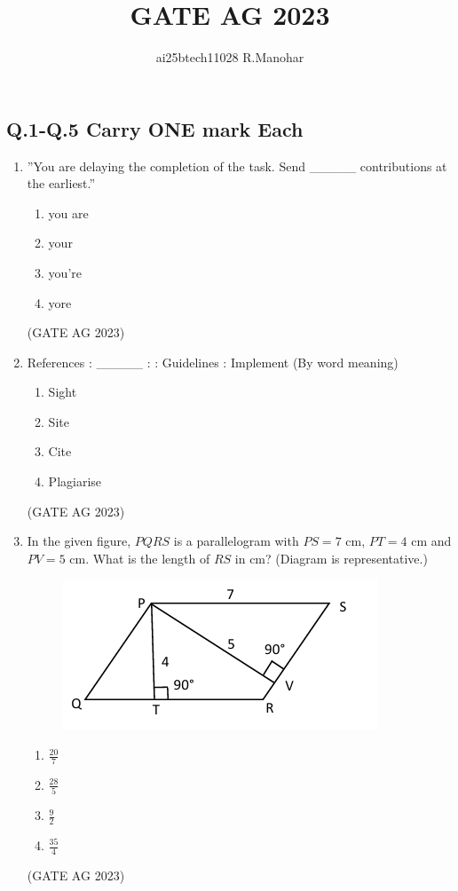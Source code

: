 \documentclass[journal,12pt,onecolumn]{IEEEtran}
\title{GATE AG 2023}
\author{ai25btech11028 R.Manohar}
\theoremstyle{remark}
\begin{document}
\maketitle

\subsection{Q.1-Q.5 Carry ONE mark Each}
\begin{enumerate}

\item ''You are delaying the completion of the task. Send \_\_\_\_\_ contributions at the earliest.''
\begin{multicols}{4}
\begin{enumerate}
    \item you are
    \item your
    \item you're
    \item yore
\end{enumerate}
\end{multicols}
\hfill{(GATE AG 2023)}

\item References : \_\_\_\_\_ : : Guidelines : Implement (By word meaning)
\begin{multicols}{4}
\begin{enumerate}
    \item Sight
    \item Site
    \item Cite
    \item Plagiarise
\end{enumerate}
\end{multicols}
\hfill{(GATE AG 2023)}

\item In the given figure, $PQRS$ is a parallelogram with $PS=7$ cm, $PT=4$ cm and $PV=5$ cm. What is the length of $RS$ in cm? (Diagram is representative.)
\begin{figure}[H]
    \centering
    \includegraphics[]{figs/Q.3.png}
    \caption{}
    \label{fig:1}
\end{figure}
\begin{multicols}{4}
\begin{enumerate}
    \item $\tfrac{20}{7}$
    \item $\tfrac{28}{5}$
    \item $\tfrac{9}{2}$
    \item $\tfrac{35}{4}$
\end{enumerate}
\end{multicols}
\hfill{(GATE AG 2023)}


\end{enumerate}
\end{document}
